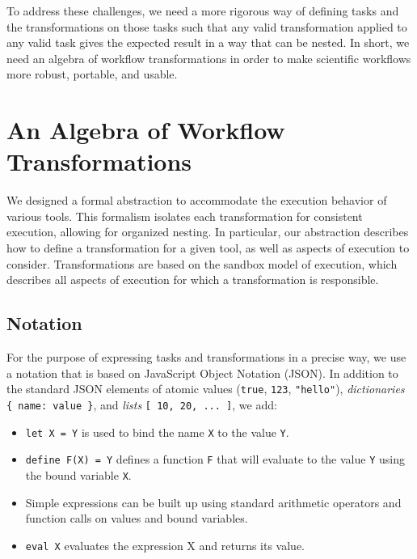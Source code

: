 \documentclass[conference]{IEEEtran}
\begin{document}
To address these challenges, we need a more
rigorous way of defining tasks and the transformations
on those tasks such that any valid transformation applied
to any valid task gives the expected result in a
way that can be nested.  In short, we need an algebra
of workflow transformations in order to make scientific
workflows more robust, portable, and usable.

%

\section{An Algebra of Workflow Transformations}

We designed a formal abstraction
to accommodate the execution behavior
of various tools. 
This formalism isolates each transformation 
for consistent execution,
allowing for organized nesting. 
In particular, our abstraction describes how to define 
a transformation for a given tool, 
as well as aspects of execution to consider. 
Transformations are based on the 
sandbox model of execution, 
which describes all aspects of execution 
for which a transformation is responsible.

\subsection{Notation}

For the purpose of expressing tasks and transformations in a
precise way, we use a notation that is based on
JavaScript Object Notation (JSON).
In addition to the standard JSON elements of 
atomic values (\verb$true$, \verb$123$, \verb$"hello"$), \emph{dictionaries} \verb${ name: value }$, and \emph{lists} \verb$[ 10, 20, ... ]$,
we add:

\begin{itemize}
    \item {\tt let X = Y} is used to bind the name {\tt X} to the value {\tt Y}.
    \item {\tt define F(X) = Y} defines a function {\tt F} that will evaluate to the value {\tt Y} using the bound variable {\tt X}.
    \item Simple expressions can be built up using standard arithmetic operators and function calls on values and bound variables.
    \item {\tt eval X} evaluates the expression X and returns its value.
\end{itemize}
\end{document}
